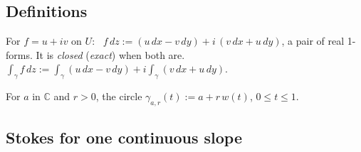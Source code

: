 \subsection*{Definitions}

\begin{lines}
\item[\lab{D1}] For $f = u + iv$ on $U$: \ $f\,dz := (u\,dx - v\,dy) + i\,(v\,dx + u\,dy)$, a pair of real 1-forms. It is \emph{closed} (\emph{exact}) when both are. \ $\int_\gamma f\,dz := \int_\gamma (u\,dx - v\,dy) + i \int_\gamma (v\,dx + u\,dy)$.
\item[\lab{D2}] For $a$ in $\mathbb{C}$ and $r > 0$, the circle $\gamma_{a,r}(t) := a + r\,w(t)$, $0 \le t \le 1$.
\end{lines}

\subsection*{Stokes for one continuous slope}

